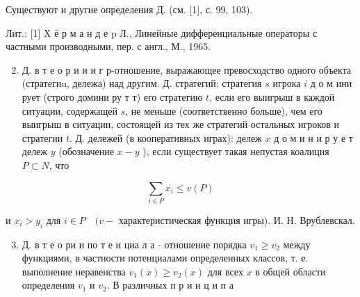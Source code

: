 \documentclass[10pt]{article}
\begin{document}
Существуют и другие определения Д. (см. [1], с. 99, 103).



Лит.: [1] X ё р м а н д е p Л., Линейные дифференциальные операторы с частными производными, пер. с англ., М., 1965.



\begin{enumerate}

  \setcounter{enumi}{1}

  \item Д. в т е о р и и и г р-отношение, выражающее превосходство одного объекта (стратегиu, дележа) над другим. Д. стратегий: стратегия $s$ игрока $i$ д о м ини рует (строго домини ру т т) его стратегию $t$, если его выигрыш в каждой ситуации, содержащей $s$, не меньше (соответственно больше), чем его выигрыш в ситуации, состоящей из тех же стратегий остальных игроков и стратегии $t$. Д. дележей (в кооперативных играх): дележ $x$ д о м и н и р у е т дележ $y$ (обозначение $x-y$ ), если существует такая непустая коалиция $P \subset N$, что

\end{enumerate}



\[

\sum_{i \in P} x_{i} \leqslant v(P)

\]



и $x_{i}>y_{i}$ для $i \in P \quad(v-$ характеристическая функция игры). И. Н. Врублевскал.



\begin{enumerate}

  \setcounter{enumi}{2}

  \item Д. в т е о ри и по т е н циа л а - отношение порядка $v_{1} \geqslant v_{2}$ между функциями, в частности потенциалами определенных классов, т. е. выполнение неравенства $v_{1}(x) \geqslant v_{2}(x)$ для всех $x$ в общей области определения $v_{1}$ и $v_{2}$. В различных п р и н ц и п а

\end{enumerate}
\end{document}
